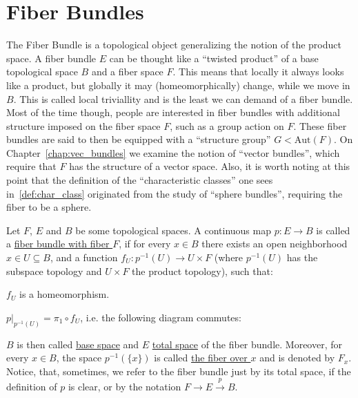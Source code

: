 \chapter{Fiber Bundles}
The Fiber Bundle is a topological object generalizing the notion of the product space. A fiber bundle $E$ can be thought like a ``twisted product'' of a base topological space $B$ and a fiber space $F$. This means that locally it always looks like a product, but globally it may (homeomorphically) change, while we move in $B$. This is called local triviallity and is the least we can demand of a fiber bundle. Most of the time though, people are interested in fiber bundles with additional structure imposed on the fiber space $F$, such as a group action on $F$. These fiber bundles are said to then be equipped with a ``structure group'' $G<\mathrm{Aut}(F)$. On Chapter~\ref{chap:vec_bundles} we examine the notion of ``vector bundles'', which require that $F$ has the structure of a vector space. Also, it is worth noting at this point that the definition of the ``characteristic classes'' one sees in~\ref{def:char_class} originated from the study of ``sphere bundles'', requiring the fiber to be a sphere.

\begin{definition}\label{def:fiber_bundle} Let $F$, $E$ and $B$ be some topological spaces. A continuous map $p:E\to B$ is called a \ul{fiber bundle with fiber $F$}, if for every $x\in B$ there exists an open neighborhood $x\in U\subseteq B$, and a function $f_U:p^{-1}(U)\to U\times F$ (where $p^{-1}(U)$ has the subspace topology and $U\times F$ the product topology), such that:
\begin{i_enum}
\item $f_U$ is a homeomorphism.
\item  $p|_{p^{-1}(U)}=\pi_1\circ f_U$, i.e. the following diagram commutes:
\begin{center}
\end{center}
\end{i_enum}
$B$ is then called \ul{base space} and $E$ \ul{total space} of the fiber bundle. Moreover, for every $x\in B$, the space $p^{-1}(\{x\})$ is called \ul{the fiber over $x$} and is denoted by $F_x$. Notice, that, sometimes, we refer to the fiber bundle just by its total space, if the definition of $p$ is clear, or by the notation $F\to E\overset{p}{\to}B$.
\end{definition}

